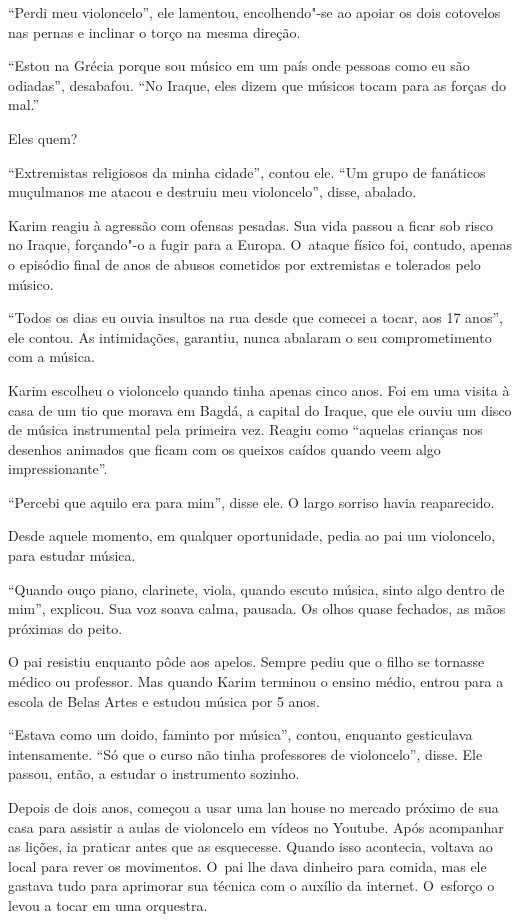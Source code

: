 ``Perdi meu violoncelo'', ele lamentou, encolhendo"-se ao apoiar os dois
cotovelos nas pernas e inclinar o torço na mesma direção.

``Estou na Grécia porque sou músico em um país onde pessoas como eu são
odiadas'', desabafou. ``No Iraque, eles dizem que músicos tocam para as
forças do mal.''

Eles quem?

``Extremistas religiosos da minha cidade'', contou ele. ``Um grupo de
fanáticos muçulmanos me atacou e destruiu meu violoncelo'', disse,
abalado.

Karim reagiu à agressão com ofensas pesadas. Sua vida passou a ficar sob
risco no Iraque, forçando"-o a fugir para a Europa. O~ataque físico foi,
contudo, apenas o episódio final de anos de abusos cometidos por
extremistas e tolerados pelo músico.

``Todos os dias eu ouvia insultos na rua desde que comecei a tocar, aos
17 anos'', ele contou.  As intimidações, garantiu, nunca abalaram o seu
comprometimento com a música.

Karim escolheu o violoncelo quando tinha apenas cinco anos. Foi em uma
visita à casa de um tio que morava em Bagdá, a capital do Iraque, que
ele ouviu um disco de música instrumental pela primeira vez. Reagiu como
``aquelas crianças nos desenhos animados que ficam com os queixos caídos
quando veem algo impressionante''.

``Percebi que aquilo era para mim'', disse ele. O largo sorriso havia
reaparecido.

Desde aquele momento, em qualquer oportunidade, pedia ao pai um
violoncelo, para estudar música.

``Quando ouço piano, clarinete, viola, quando escuto música, sinto algo
dentro de mim'', explicou. Sua voz soava calma, pausada. Os olhos quase
fechados, as mãos próximas do peito.

O pai resistiu enquanto pôde aos apelos. Sempre pediu que o filho se
tornasse médico ou professor. Mas quando Karim terminou o ensino médio,
entrou para a escola de Belas Artes e estudou música por 5 anos.

``Estava como um doido, faminto por música'', contou, enquanto
gesticulava intensamente. ``Só que o curso não tinha professores de
violoncelo'', disse. Ele passou, então, a estudar o instrumento sozinho.

Depois de dois anos, começou a usar uma lan house no mercado próximo de
sua casa para assistir a aulas de violoncelo em vídeos no Youtube. Após
acompanhar as lições, ia praticar antes que as esquecesse. Quando isso
acontecia, voltava ao local para rever os movimentos. O~pai lhe dava
dinheiro para comida, mas ele gastava tudo para aprimorar sua técnica com o
auxílio da internet. O~esforço o levou a tocar em uma orquestra.

